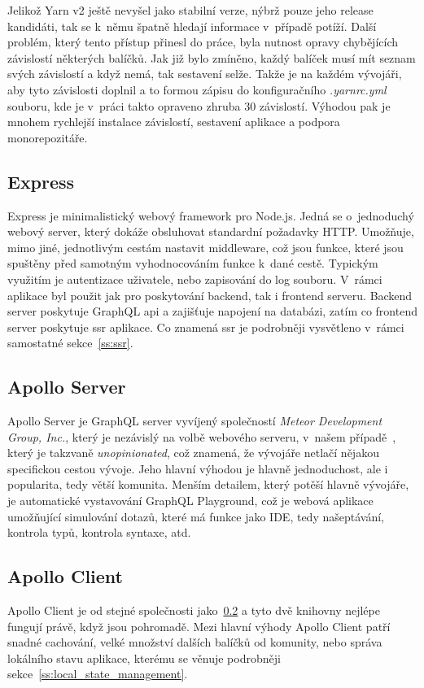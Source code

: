 Jelikož Yarn v2 ještě nevyšel jako stabilní verze, nýbrž pouze jeho release kandidáti, tak se k~němu špatně hledají informace v~případě potíží. Další problém, který tento přístup přinesl do práce, byla nutnost opravy chybějících závislostí některých balíčků. Jak již bylo zmíněno, každý balíček musí mít seznam svých závislostí a když nemá, tak sestavení selže. Takže je na každém vývojáři, aby tyto závislosti doplnil a to formou zápisu do konfiguračního \emph{.yarnrc.yml} souboru, kde je v~práci takto opraveno zhruba 30 závislostí. Výhodou pak je mnohem rychlejší instalace závislostí, sestavení aplikace a podpora monorepozitáře.

\subsection{Express}
\label{ss:express}
Express je minimalistický webový framework pro Node.js. Jedná se o~jednoduchý webový server, který dokáže obsluhovat standardní požadavky HTTP. Umožňuje, mimo jiné, jednotlivým cestám nastavit middleware, což jsou funkce, které jsou spuštěny před samotným vyhodnocováním funkce k~dané cestě. Typickým využitím je autentizace uživatele, nebo zapisování do log souboru. V~rámci aplikace byl použit jak pro poskytování backend, tak i frontend serveru. Backend server poskytuje GraphQL \acrshort{api} a zajišťuje napojení na databázi, zatím co frontend server poskytuje \acrfull{ssr} aplikace. Co znamená \acrshort{ssr} je podrobněji vysvětleno v~rámci samostatné sekce~\ref{ss:ssr}.

\subsection{Apollo Server}
\label{ss:apollo_server}
Apollo Server je GraphQL server vyvíjený společností \emph{Meteor Development Group, Inc.}, který je nezávislý na volbě webového serveru, v~našem případě~, který je takzvaně \emph{unopinionated}, což znamená, že vývojáře netlačí nějakou specifickou cestou vývoje. Jeho hlavní výhodou je hlavně jednoduchost, ale i popularita, tedy větší komunita. Menším detailem, který potěší hlavně vývojáře, je automatické vystavování GraphQL Playground, což je webová aplikace umožňující simulování dotazů, které má funkce jako IDE, tedy našeptávání, kontrola typů, kontrola syntaxe, atd.

\subsection{Apollo Client}
\label{ss:apollo_client}
Apollo Client je od stejné společnosti jako~\ref{ss:apollo_server} a tyto dvě knihovny nejlépe fungují právě, když jsou pohromadě. Mezi hlavní výhody Apollo Client patří snadné cachování, velké množství dalších balíčků od komunity, nebo správa lokálního stavu aplikace, kterému se věnuje podrobněji sekce~\ref{ss:local_state_management}.

